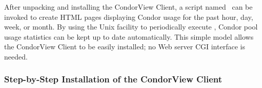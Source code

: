 After unpacking and installing the CondorView Client, a script named
\MakeStats\ can be invoked to create HTML pages displaying Condor usage
for the past hour, day, week, or month.  
By using the Unix  facility to periodically execute
\MakeStats, Condor pool usage statistics can be kept up to date
automatically.  
This simple model allows the CondorView Client to be easily installed;
no Web server CGI interface is needed.

\subsubsection{\label{sec:condorview-client-step-by-step}
Step-by-Step Installation of the CondorView Client}

